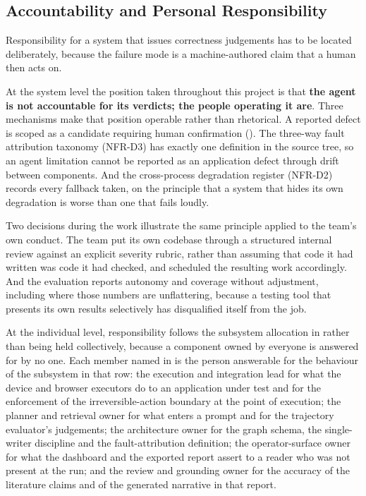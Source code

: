 \subsection{Accountability and Personal Responsibility}
\label{sec:accountability}

Responsibility for a system that issues correctness judgements has to be
located deliberately, because the failure mode is a machine-authored claim that
a human then acts on.

At the system level the position taken throughout this project is that
\textbf{the agent is not accountable for its verdicts; the people operating it
are}. Three mechanisms make that position operable rather than rhetorical. A
reported defect is scoped as a candidate requiring human confirmation
(). The three-way fault attribution taxonomy (NFR-D3) has
exactly one definition in the source tree, so an agent limitation cannot be
reported as an application defect through drift between components. And the
cross-process degradation register (NFR-D2) records every fallback taken, on
the principle that a system that hides its own degradation is worse than one
that fails loudly.

Two decisions during the work illustrate the same principle applied to the
team's own conduct. The team put its own codebase through a structured internal
review against an explicit severity rubric, rather than assuming that code it
had written was code it had checked, and scheduled the resulting work
accordingly. And the evaluation reports autonomy and coverage without
adjustment, including where those numbers are unflattering, because a testing
tool that presents its own results selectively has disqualified itself from the
job.

At the individual level, responsibility follows the subsystem allocation in
 rather than being held collectively, because a
component owned by everyone is answered for by no one. Each member named in
 is the person answerable for the behaviour of the subsystem
in that row: the execution and integration lead for what the device and browser
executors do to an application under test and for the enforcement of the
irreversible-action boundary at the point of execution; the planner and
retrieval owner for what enters a prompt and for the trajectory evaluator's
judgements; the architecture owner for the graph schema, the single-writer
discipline and the fault-attribution definition; the operator-surface owner for
what the dashboard and the exported report assert to a reader who was not
present at the run; and the review and grounding owner for the accuracy of the
literature claims and of the generated narrative in that report.

